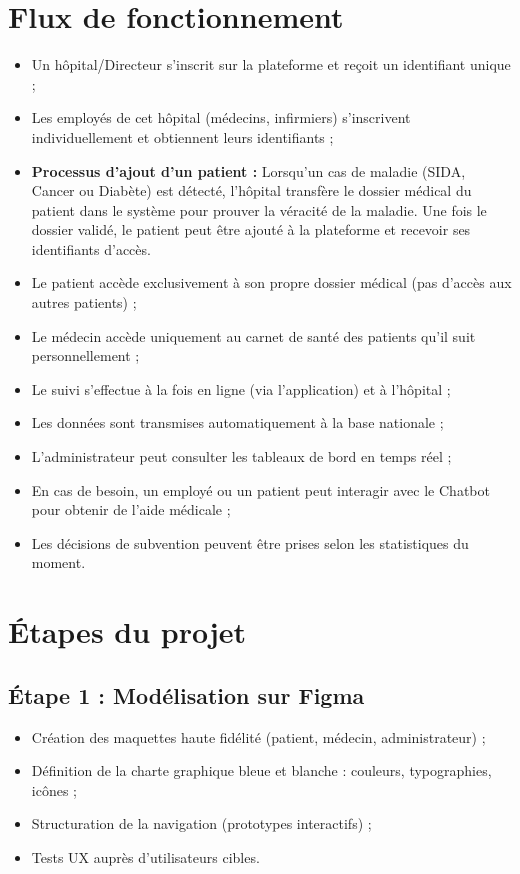 ﻿\documentclass[12pt,a4paper]{report}
\begin{document}
\section*{Flux de fonctionnement} 
\begin{itemize}
    \item Un hôpital/Directeur s'inscrit sur la plateforme et reçoit un identifiant unique ;
    \item Les employés de cet hôpital (médecins, infirmiers) s'inscrivent individuellement et obtiennent leurs identifiants ;
    \item \textbf{Processus d'ajout d'un patient :} Lorsqu'un cas de maladie (SIDA, Cancer ou Diabète) est détecté, l'hôpital transfère le dossier médical du patient dans le système pour prouver la véracité de la maladie. Une fois le dossier validé, le patient peut être ajouté à la plateforme et recevoir ses identifiants d'accès.
    \item Le patient accède exclusivement à son propre dossier médical (pas d'accès aux autres patients) ;
    \item Le médecin accède uniquement au carnet de santé des patients qu'il suit personnellement ;
    \item Le suivi s'effectue à la fois en ligne (via l'application) et à l'hôpital ;
    \item Les données sont transmises automatiquement à la base nationale ;
    \item L'administrateur peut consulter les tableaux de bord en temps réel ;
    \item En cas de besoin, un employé ou un patient peut interagir avec le Chatbot pour obtenir de l'aide médicale ;
    \item Les décisions de subvention peuvent être prises selon les statistiques du moment.
\end{itemize}
\newpage  
\section*{Étapes du projet}  

\subsection*{Étape 1 : Modélisation sur Figma}  
\begin{itemize}
    \item Création des maquettes haute fidélité (patient, médecin, administrateur) ;
    \item Définition de la charte graphique bleue et blanche : couleurs, typographies, icônes ;
    \item Structuration de la navigation (prototypes interactifs) ;
    \item Tests UX auprès d’utilisateurs cibles.
\end{itemize}
\end{document}
